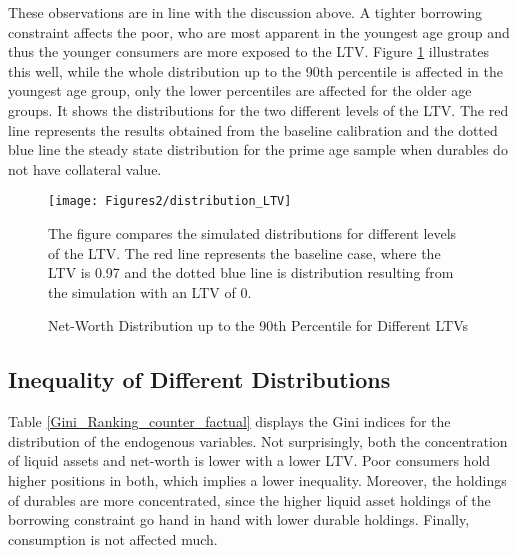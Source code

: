 \documentclass[a4paper,12pt,legno]{article}
\begin{document}
These observations are in line with the discussion above. A tighter borrowing constraint affects the poor, who are most apparent in the youngest age group and thus the younger consumers are more exposed to the LTV. Figure \ref{downpayment_vs_baseline} illustrates this well, while the whole distribution up to the 90th percentile is affected in the youngest age group, only the lower percentiles are affected for the older age groups. It shows the distributions for the two different levels of the LTV. The red line represents the results obtained from the baseline calibration and the dotted blue line the steady state distribution for the prime age sample when durables do not have collateral value. 

\begin{figure}[!htbp]
\caption{Net-Worth Distribution up to the 90th Percentile for Different LTVs} 
\label{downpayment_vs_baseline}	%
\centering
\texttt{[image: Figures2/distribution\_LTV]}  %

\begin{minipage}{0.8\linewidth}
\footnotesize{The figure compares the simulated distributions for different levels of the LTV. The red line represents the baseline case, where the LTV is 0.97 and the dotted blue line is distribution resulting from the simulation with an LTV of 0.}
\end{minipage}

\end{figure}

\subsection{Inequality of Different Distributions}
Table \ref{Gini_Ranking_counter_factual} displays the Gini indices for the distribution of the endogenous variables. Not surprisingly, both the concentration of liquid assets and net-worth is lower with a lower LTV. Poor consumers hold higher positions in both, which implies a lower inequality. Moreover, the holdings of durables are more concentrated, since the higher liquid asset holdings of the borrowing constraint go hand in hand with lower durable holdings. Finally, consumption is not affected much.  
\end{document}
